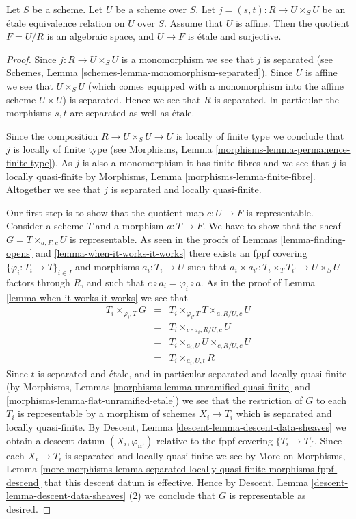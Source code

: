 \begin{lemma}
\label{lemma-presentation-quasi-compact}
Let $S$ be a scheme.
Let $U$ be a scheme over $S$.
Let $j = (s, t) : R \to U \times_S U$
be an \'etale equivalence relation on $U$ over $S$.
Assume that $U$ is affine. Then the quotient $F = U/R$
is an algebraic space, and $U \to F$ is \'etale and surjective.
\end{lemma}

\begin{proof}
Since $j : R \to U \times_S U$ is a monomorphism we see that $j$ is separated
(see Schemes, Lemma \ref{schemes-lemma-monomorphism-separated}).
Since $U$ is affine we see that $U \times_S U$
(which comes equipped with a monomorphism into the affine scheme
$U \times U$) is separated. Hence we see that $R$ is separated.
In particular the morphisms $s, t$ are separated as well as \'etale.

\medskip\noindent
Since the composition $R \to U \times_S U \to U$ is
locally of finite type we conclude that
$j$ is locally of finite type (see
Morphisms, Lemma \ref{morphisms-lemma-permanence-finite-type}).
As $j$ is also a monomorphism it has finite fibres and
we see that $j$ is locally quasi-finite by
Morphisms, Lemma \ref{morphisms-lemma-finite-fibre}.
Altogether we see that $j$ is separated and locally quasi-finite.

\medskip\noindent
Our first step is to show that the quotient map
$c : U \to F$ is representable.
Consider a scheme $T$ and a morphism $a : T \to F$.
We have to show that the sheaf $G = T \times_{a, F, c} U$
is representable.
As seen in the proofs of Lemmas \ref{lemma-finding-opens} and
\ref{lemma-when-it-works-it-works} there exists an fppf covering
$\{\varphi_i : T_i \to T\}_{i \in I}$ and morphisms $a_i : T_i \to U$
such that $a_i \times a_{i'} : T_i \times_T T_{i'} \to U \times_S U$
factors through $R$, and such that $c \circ a_i = \varphi_i \circ a$.
As in the proof of Lemma \ref{lemma-when-it-works-it-works} we see that
\begin{eqnarray*}
T_i \times_{\varphi_i, T} G & = &
T_i \times_{\varphi_i, T} T \times_{a, R/U, c} U \\
& = & T_i \times_{c \circ a_i, R/U, c} U \\
& = & T_i \times_{a_i, U} U \times_{c, R/U, c} U \\
& = & T_i \times_{a_i, U, t} R
\end{eqnarray*}
Since $t$ is separated and \'etale, and in particular
separated and locally quasi-finite (by Morphisms, Lemmas
\ref{morphisms-lemma-unramified-quasi-finite} and
\ref{morphisms-lemma-flat-unramified-etale})
we see that the restriction
of $G$ to each $T_i$ is representable by a morphism of schemes
$X_i \to T_i$ which is separated and locally quasi-finite. By
Descent, Lemma \ref{descent-lemma-descent-data-sheaves}
we obtain a descent datum $(X_i, \varphi_{ii'})$ relative
to the fppf-covering $\{T_i \to T\}$. Since each
$X_i \to T_i$ is separated and locally quasi-finite we see by
More on Morphisms, Lemma
\ref{more-morphisms-lemma-separated-locally-quasi-finite-morphisms-fppf-descend}
that this descent datum is effective.
Hence by
Descent, Lemma \ref{descent-lemma-descent-data-sheaves} (2)
we conclude that $G$ is representable as desired.


\end{proof}
